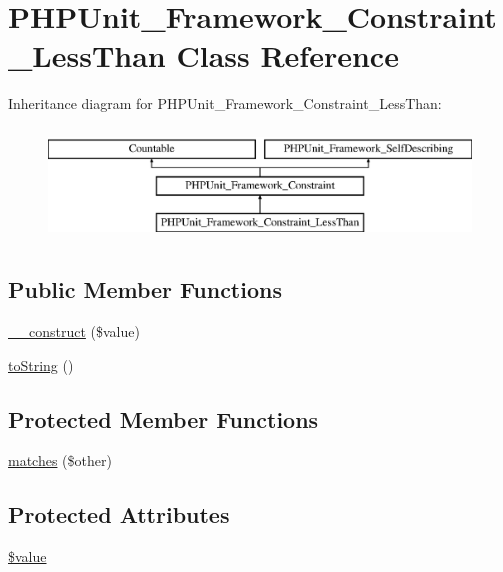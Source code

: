 \hypertarget{class_p_h_p_unit___framework___constraint___less_than}{}\section{P\+H\+P\+Unit\+\_\+\+Framework\+\_\+\+Constraint\+\_\+\+Less\+Than Class Reference}
\label{class_p_h_p_unit___framework___constraint___less_than}
Inheritance diagram for P\+H\+P\+Unit\+\_\+\+Framework\+\_\+\+Constraint\+\_\+\+Less\+Than\+:\begin{figure}[H]
\begin{center}
\leavevmode
\includegraphics[height=3.000000cm]{class_p_h_p_unit___framework___constraint___less_than}
\end{center}
\end{figure}
\subsection*{Public Member Functions}
\begin{DoxyCompactItemize}
\item 
\mbox{\hyperlink{class_p_h_p_unit___framework___constraint___less_than_a7e17a19b592345a03763f050fffe0ce7}{\+\_\+\+\_\+construct}} (\$value)
\item 
\mbox{\hyperlink{class_p_h_p_unit___framework___constraint___less_than_a5558c5d549f41597377fa1ea8a1cefa3}{to\+String}} ()
\end{DoxyCompactItemize}
\subsection*{Protected Member Functions}
\begin{DoxyCompactItemize}
\item 
\mbox{\hyperlink{class_p_h_p_unit___framework___constraint___less_than_a9c9c337de483bbdbb9fa249a6c7c9cc5}{matches}} (\$other)
\end{DoxyCompactItemize}
\subsection*{Protected Attributes}
\begin{DoxyCompactItemize}
\item 
\mbox{\hyperlink{class_p_h_p_unit___framework___constraint___less_than_a0f298096f322952a72a50f98a74c7b60}{\$value}}
\end{DoxyCompactItemize}


